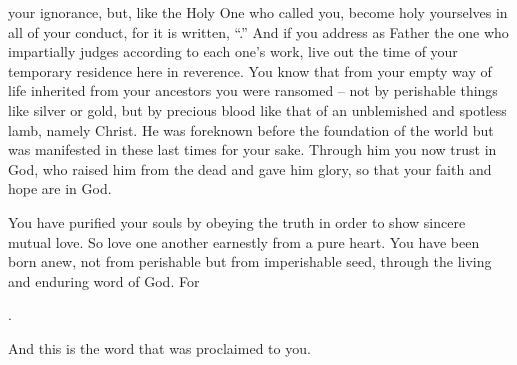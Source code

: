 {your
ignorance,
but,
like
the Holy One
who called
you,
become
holy
yourselves
in
all
of your conduct,
for
it is written, “{}.”
And
if
you address
as Father
the one who impartially
judges
according to
each one’s
work,
live out
the time
of your
temporary residence
here in
reverence.
You know
that
from
your
empty
way of life
inherited from
your ancestors
you were ransomed
– not
by perishable
things like silver
or
gold,
but
by precious
blood
like
that of an unblemished
and
spotless
lamb,
namely Christ.
He was foreknown
before
the foundation
of the world
but
was manifested
in
these last
times
for
your
sake.
Through
him
you now trust
in
God,
who raised
him
from
the dead
and
gave
him
glory,
so that
your
faith
and
hope
are
in
God.
\par }{\PP {}You have purified
your
souls
by
obeying
the truth
in order to show
sincere
mutual love.
So love
one another
earnestly
from
a pure heart.
You have been born anew,
not
from
perishable
but
from imperishable
seed,
through
the living
and
enduring
word
of God.
For
\par }{
\par }{
\par }{
\par }{\Q {}.
\par }{\PI And
this
is
the word
that was proclaimed
to
you.

}
